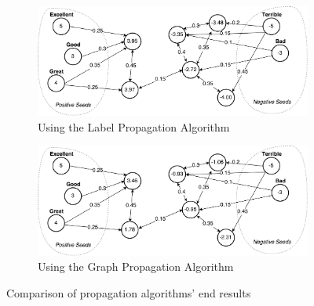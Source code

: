 \begin{figure}[t]
    \centering
    \begin{subfigure}[b]{1.0\textwidth}
        \includegraphics[width=\textwidth]{./figs/label_propagation}
        \caption{Using the Label Propagation Algorithm}
        \label{fig:label_propagation}
    \end{subfigure}
    \begin{subfigure}[b]{1.0\textwidth}
        \includegraphics[width=\textwidth]{./figs/graph_propagation}
        \caption{Using the Graph Propagation Algorithm}
        \label{fig:graph_propagation}
    \end{subfigure}
    \caption{Comparison of propagation algorithms' end results}
    \label{fig:propagation_comparison}
\end{figure}


